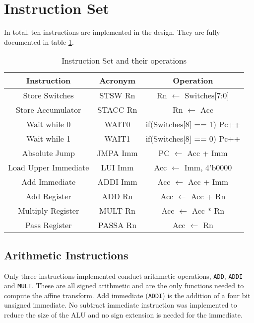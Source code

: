 

\section{Instruction Set}

In total, ten instructions are implemented in the design.
They are fully documented in table \ref{tab:isa}. 


\begin{table}
\caption{Instruction Set and their operations}
\label{tab:isa}
\begin{tabular}{ccc} \toprule
Instruction & Acronym & Operation \\ \midrule
Store Switches & STSW Rn & Rn $\leftarrow$ Switches[7:0] \\
Store Accumulator & STACC Rn & Rn $\leftarrow$ Acc \\
Wait while 0 & WAIT0 & if(Switches[8] == 1) Pc++ \\
Wait while 1 & WAIT1 & if(Switches[8] == 0) Pc++ \\
Absolute Jump & JMPA Imm & PC $\leftarrow$ Acc + Imm \\
Load Upper Immediate & LUI Imm & Acc $\leftarrow$ {Imm, 4'b0000} \\
Add Immediate & ADDI Imm & Acc $\leftarrow$ Acc + Imm \\
Add Register & ADD Rn & Acc $\leftarrow$ Acc + Rn \\
Multiply Register & MULT Rn & Acc $\leftarrow$ Acc * Rn \\
Pass Register & PASSA Rn & Acc $\leftarrow$ Rn \\ \bottomrule
\end{tabular}
\end{table}


\subsection{Arithmetic Instructions}

Only three instructions implemented conduct arithmetic operations, \texttt{ADD}, \texttt{ADDI} and \texttt{MULT}. 
These are all signed arithmetic and are the only functions needed to compute the affine transform. 
Add immediate (\texttt{ADDI}) is the addition of a four bit unsigned immediate. 
No subtract immediate instruction was implemented to reduce the size of the ALU and no sign extension is needed for the immediate. 

